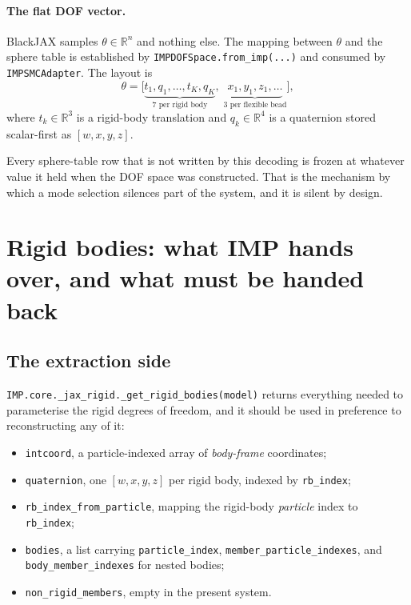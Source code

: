 \documentclass[11pt]{article}
\newcommand{\code}[1]{\texttt{#1}}
\begin{document}
\paragraph{The flat DOF vector.}
BlackJAX samples $\theta \in \mathbb{R}^{n}$ and nothing else. The mapping
between $\theta$ and the sphere table is established by
\code{IMPDOFSpace.from\_imp(...)} and consumed by \code{IMPSMCAdapter}. The
layout is
\[
  \theta = \bigl[\underbrace{t_1, q_1, \ldots, t_{K}, q_{K}}_{\text{7 per rigid body}},\;
                 \underbrace{x_1, y_1, z_1, \ldots}_{\text{3 per flexible bead}}\bigr],
\]
where $t_k \in \mathbb{R}^3$ is a rigid-body translation and $q_k \in
\mathbb{R}^4$ is a quaternion stored scalar-first as $[w,x,y,z]$.

Every sphere-table row that is not written by this decoding is frozen at
whatever value it held when the DOF space was constructed. That is the
mechanism by which a mode selection silences part of the system, and it is
silent by design.

\section{Rigid bodies: what IMP hands over, and what must be handed back}

\subsection{The extraction side}

\code{IMP.core.\_jax\_rigid.\_get\_rigid\_bodies(model)} returns everything
needed to parameterise the rigid degrees of freedom, and it should be used in
preference to reconstructing any of it:

\begin{itemize}[leftmargin=1.5em]
  \item \code{intcoord}, a particle-indexed array of \emph{body-frame}
    coordinates;
  \item \code{quaternion}, one $[w,x,y,z]$ per rigid body, indexed by
    \code{rb\_index};
  \item \code{rb\_index\_from\_particle}, mapping the rigid-body \emph{particle}
    index to \code{rb\_index};
  \item \code{bodies}, a list carrying \code{particle\_index},
    \code{member\_particle\_indexes}, and \code{body\_member\_indexes} for
    nested bodies;
  \item \code{non\_rigid\_members}, empty in the present system.
\end{itemize}
\end{document}
